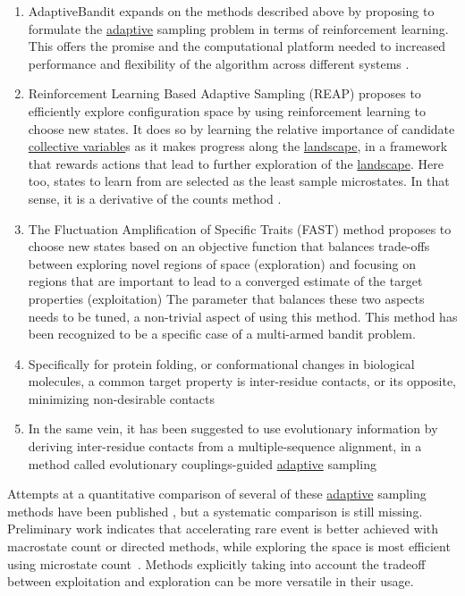 \documentclass[9pt,review]{livecoms}
\begin{document}
    \begin{enumerate}
    \item AdaptiveBandit expands on the methods described above by proposing to formulate the \hyperlink{ref:Adaptive} {adaptive} sampling problem in terms of reinforcement learning. This offers the promise and the computational platform needed to increased performance and flexibility of the algorithm across different systems \cite{doi:10.1021/acs.jctc.0c00205}.
    \item Reinforcement Learning Based Adaptive Sampling (REAP) proposes to efficiently explore configuration space by using reinforcement learning to choose new states. It does so by learning the relative importance of candidate \hyperlink{ref:CV} {collective variable}s as it makes progress along the \hyperlink{ref:FES} {landscape}, in a framework that rewards actions that lead to further exploration of the \hyperlink{ref:FES} {landscape}. Here too, states to learn from are selected as the least sample microstates. In that sense, it is a derivative of the counts method \cite{doi:10.1021/acs.jpcb.8b06521}.
    \item The Fluctuation Amplification of Specific Traits (FAST) method proposes to choose new states based on an objective function that balances trade-offs between exploring novel regions of space (exploration) and focusing on regions that are important to lead to a converged estimate of the target properties (exploitation) \cite{doi:10.1021/acs.jctc.5b00737,doi:10.1021/acs.jctc.8b00500} The parameter that balances these two aspects needs to be tuned, a non-trivial aspect of using this method. This method has been recognized to be a specific case of a multi-armed bandit problem.
    \item Specifically for protein folding, or conformational changes in biological molecules, a common target property is inter-residue contacts, or its opposite, minimizing non-desirable contacts \cite{doi:10.1063/1.5053582}
    \item In the same vein, it has been suggested to use evolutionary information by deriving inter-residue contacts from a multiple-sequence alignment, in a method called evolutionary couplings-guided \hyperlink{ref:Adaptive} {adaptive} sampling \cite{shamsi_enhanced_2017}
    \end{enumerate}


Attempts at a quantitative comparison of several of these \hyperlink{ref:Adaptive} {adaptive} sampling methods have been published \cite{doi:10.1063/1.5053582,doi:10.1021/acs.jctc.8b00500}, but a systematic comparison is still missing. Preliminary work indicates that accelerating rare event is better achieved with macrostate count or directed methods, while exploring the space is most efficient using microstate count~\cite{doi:10.1063/1.5053582}. Methods explicitly taking into account the tradeoff between exploitation and exploration can be more versatile in their usage.
\end{document}
